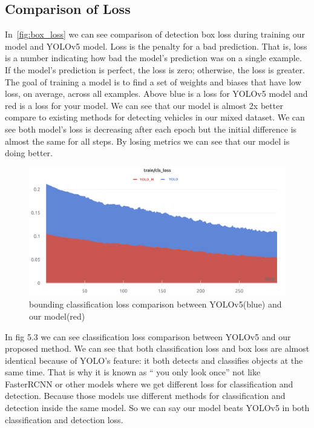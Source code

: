 \subsection{Comparison of Loss }
In~\ref{fig:box_loss} we can see comparison of detection box loss during training our model and YOLOv5 model. Loss is the penalty for a bad prediction. That is, loss is a number indicating how bad the model's prediction was on a single example. If the model's prediction is perfect, the loss is zero; otherwise, the loss is greater. The goal of training a model is to find a set of weights and biases that have low loss, on average, across all examples. Above blue is a loss for YOLOv5 model and red is a loss for your model. We can see that our model is almost 2x better compare to existing methods for detecting vehicles in our mixed dataset. We can see both model's loss is decreasing after each epoch but the initial difference is almost the same for all steps. By losing metrics we can see that our model is doing better.
\newpage
\begin{figure}[h]
    \centering
    \includegraphics[max width=\textwidth]{images/ours/cls-loss.png}
   \caption[Train classification loss comparison of original YOLOv5 and proposed model]{ bounding classification loss comparison between YOLOv5(blue) and our model(red)}
    \label{fig:cls_loss}
\end{figure}

In fig 5.3 we can see classification loss comparison between YOLOv5 and our proposed method. We can see that both classification loss and box loss are almost identical because of YOLO's feature: it both detects and classifies objects at the same time. That is why it is known as “ you only look once” not like FasterRCNN or other models where we get different loss for classification and detection. Because those models use different methods for classification and detection inside the same model. So we can say our model beats YOLOv5 in both classification and detection loss. 

